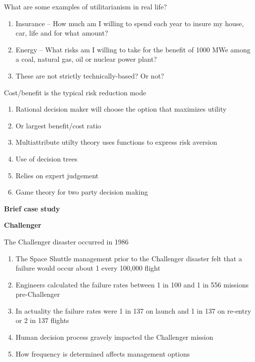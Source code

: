 \documentclass[aspectratio=1610,pdftex,dvipsnames,compress,xcolor={dvipsnames}]{beamer}
\begin{document}
\begin{frame}{What are some examples of utilitarianism in real life?}
    \begin{enumerate}[series=outerlist,topsep=0pt,itemsep=21pt,leftmargin=*,label=(\arabic*)]
        \item[]Insurance -- How much am I willing to spend each year to insure my house, car, life and for what amount?
        \item[]Energy -- What risks am I willing to take for the benefit of 1000 MWe among a coal, natural gas, oil or nuclear power plant?
        \item[]These are not strictly technically-based? Or not?
    \end{enumerate}
\end{frame}


\begin{frame}{Cost/benefit is the typical risk reduction mode}
    \begin{enumerate}[series=outerlist,topsep=0pt,itemsep=21pt,leftmargin=*,label=(\arabic*)]
        \item[]Rational decision maker will choose the option that maximizes utility
        \item[]Or largest benefit/cost ratio
        \item[]Multiattribute utilty theory uses functions to express risk aversion
        \item[]Use of decision trees
        \item[]Relies on expert judgement
        \item[]Game theory for two party decision making
    \end{enumerate}
\end{frame}


\begin{frame}[plain]{}
    \centering\LARGE\textbf{Brief case study}
\end{frame}


\begin{frame}[plain]{}
    \centering\LARGE\textbf{Challenger}
\end{frame}


\addtocounter{framenumber}{-2}
\begin{frame}{The Challenger disaster occurred in 1986}
    \begin{enumerate}[series=outerlist,topsep=0pt,itemsep=21pt,leftmargin=*,label=(\arabic*)]
        \item[]The Space Shuttle management prior to the Challenger disaster felt that a failure would occur about 1 every 100,000 flight
        \item[]Engineers calculated the failure rates between 1 in 100 and 1 in 556 missions pre-Challenger
        \item[]In actuality the failure rates were 1 in 137 on launch and 1 in 137 on re-entry or 2 in 137 flights
        \item[]Human decision process gravely impacted the Challenger mission 
        \item[]How frequency is determined affects management options
    \end{enumerate}
\end{frame}
\end{document}
